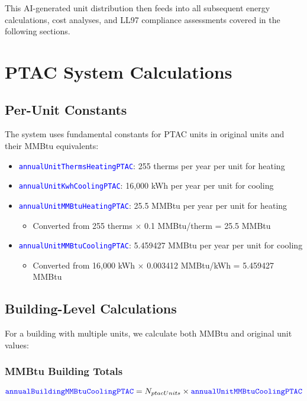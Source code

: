\documentclass{article}
\newcommand{\code}[1]{\textcolor{blue}{\texttt{#1}}}
\begin{document}
This AI-generated unit distribution then feeds into all subsequent energy calculations, cost analyses, and LL97 compliance assessments covered in the following sections.

\section{PTAC System Calculations}

\subsection{Per-Unit Constants}

The system uses fundamental constants for PTAC units in original units and their MMBtu equivalents:

\begin{itemize}
    \item \code{annualUnitThermsHeatingPTAC}: 255 therms per year per unit for heating
    \item \code{annualUnitKwhCoolingPTAC}: 16,000 kWh per year per unit for cooling
    \item \code{annualUnitMMBtuHeatingPTAC}: 25.5 MMBtu per year per unit for heating
        \begin{itemize}
            \item Converted from 255 therms × 0.1 MMBtu/therm = 25.5 MMBtu
        \end{itemize}
    \item \code{annualUnitMMBtuCoolingPTAC}: 5.459427 MMBtu per year per unit for cooling
        \begin{itemize}
            \item Converted from 16,000 kWh × 0.003412 MMBtu/kWh = 5.459427 MMBtu
        \end{itemize}
\end{itemize}

\subsection{Building-Level Calculations}

For a building with multiple units, we calculate both MMBtu and original unit values:

\subsubsection{MMBtu Building Totals}
\begin{equation}
\code{annualBuildingMMBtuCoolingPTAC} = N_{ptacUnits} \times \code{annualUnitMMBtuCoolingPTAC}
\end{equation}
\end{document}
